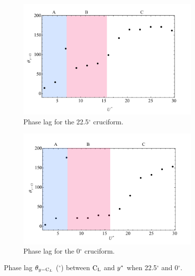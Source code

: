 \documentclass[oneside]{utmthesis}
\begin{document}
\begin{figure}[H]
  \centering
  \begin{subfigure}[h]{0.9\textwidth}
    \includegraphics[width=\textwidth]{figs/phaseLag2}
    \caption{Phase lag for the 22.5$^{\circ}$ cruciform.}
    \label{fig:phaseLag225deg}
  \end{subfigure}

  \begin{subfigure}[h]{0.9\textwidth}
    \includegraphics[width=\textwidth]{figs/phaseLag1}
    \caption{Phase lag for the 0$^{\circ}$ cruciform.}
    \label{fig:phaseLag00deg}
  \end{subfigure}

  \caption{Phase lag $\theta_{y-\text{C}_{L}}$ ($^{\circ}$) between $\text{C}_{\text{L}}$ and $y^{*}$ when 22.5$^{\circ}$ and 0$^{\circ}$.}
  \label{fig:phaseLag22500deg}
\end{figure}
\end{document}
